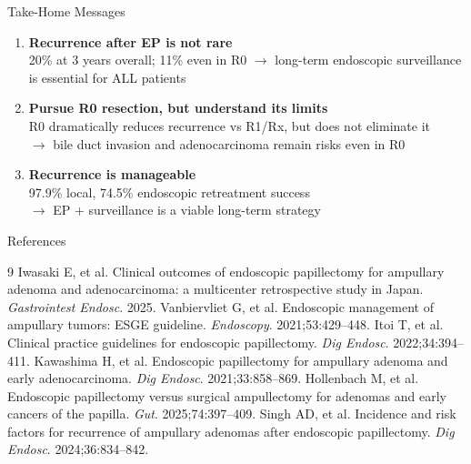\documentclass[aspectratio=169,10pt]{beamer}
\newcommand{\HL}[1]{\textcolor{emphasis}{#1}}
\begin{document}
\begin{frame}{Take-Home Messages}
\begin{enumerate}
  \item[\HL{1.}] \textbf{Recurrence after EP is not rare}\\
  20\% at 3 years overall; 11\% even in R0 $\to$
  \HL{long-term endoscopic surveillance is essential for ALL patients}

  \vspace{8pt}
  \item[\HL{2.}] \textbf{Pursue R0 resection, but understand its limits}\\
  R0 dramatically reduces recurrence vs R1/Rx, but does not eliminate it\\
  $\to$ \HL{bile duct invasion and adenocarcinoma remain risks even in R0}

  \vspace{8pt}
  \item[\HL{3.}] \textbf{Recurrence is manageable}\\
  97.9\% local, 74.5\% endoscopic retreatment success\\
  $\to$ \HL{EP + surveillance is a viable long-term strategy}
\end{enumerate}
\end{frame}

\begin{frame}{References}
\small
\begin{thebibliography}{9}
   Iwasaki E, et al. Clinical outcomes of endoscopic papillectomy for ampullary adenoma and adenocarcinoma: a multicenter retrospective study in Japan. \textit{Gastrointest Endosc}. 2025.
   Vanbiervliet G, et al. Endoscopic management of ampullary tumors: ESGE guideline. \textit{Endoscopy}. 2021;53:429--448.
   Itoi T, et al. Clinical practice guidelines for endoscopic papillectomy. \textit{Dig Endosc}. 2022;34:394--411.
   Kawashima H, et al. Endoscopic papillectomy for ampullary adenoma and early adenocarcinoma. \textit{Dig Endosc}. 2021;33:858--869.
   Hollenbach M, et al. Endoscopic papillectomy versus surgical ampullectomy for adenomas and early cancers of the papilla. \textit{Gut}. 2025;74:397--409.
   Singh AD, et al. Incidence and risk factors for recurrence of ampullary adenomas after endoscopic papillectomy. \textit{Dig Endosc}. 2024;36:834--842.
\end{thebibliography}
\end{frame}
\end{document}
